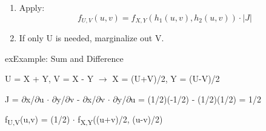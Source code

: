 \begin{enumerate}
\def\labelenumi{\arabic{enumi}.}
\setcounter{enumi}{2}
\item
  Apply:\PSbr{}\[f_{U,V}(u,v) = f_{X,Y}(h_1(u,v), h_2(u,v)) \cdot |J|\]
\item
  If only U is needed, marginalize out V.
\end{enumerate}

\begin{PSbox}[unbreakable]{ex}{Example: Sum and Difference}

U = X + Y, V = X - Y \ensuremath{\to} X = (U+V)/2, Y = (U-V)/2

J = \textbar{}\ensuremath{\partial}x/\ensuremath{\partial}u \ensuremath{\cdot} \ensuremath{\partial}y/\ensuremath{\partial}v - \ensuremath{\partial}x/\ensuremath{\partial}v \ensuremath{\cdot} \ensuremath{\partial}y/\ensuremath{\partial}u\textbar{} = \textbar{}(1/2)(-1/2) - (1/2)(1/2)\textbar{} = 1/2

f\textsubscript{U,V}(u,v) = (1/2) \ensuremath{\cdot} f\textsubscript{X,Y}((u+v)/2, (u-v)/2)

\end{PSbox}


